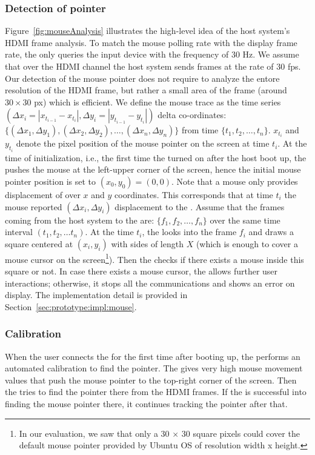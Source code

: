 \subsubsection{\bfseries Detection of pointer} Figure~\ref{fig:mouseAnalysis} illustrates the high-level idea of the host system's HDMI frame analysis. To match the mouse polling rate with the display frame rate, the \device only queries the input device with the frequency of $30$ Hz. We assume that over the HDMI channel the host system sends frames at the rate of $30$ fps. Our detection of the mouse pointer does not require to analyze the entore resolution of the HDMI frame, but rather a small area of the frame (around $30\times 30$ px) which is efficient. We define the mouse trace as the time series $(\Delta x_i = |x_{t_{i-1}} - x_{t_{i}}|, \Delta y_i=|y_{t_{i-1}} - y_{t_{i}}|)$ delta co-ordinates: $\{(\Delta x_1, \Delta y_1), (\Delta x_2, \Delta y_2), \ldots, (\Delta x_n, \Delta y_n)\}$ from time $\{t_1, t_2, \ldots, t_n\}$. $x_{t_{i}}$ and $y_{t_{i}}$ denote the pixel position of the mouse pointer on the screen at time $t_i$. At the time of initialization, i.e., the first time the \device turned on after the host boot up, the \device pushes the mouse at the left-upper corner of the screen, hence the initial mouse pointer position is set to $(x_0, y_0) = (0, 0)$.  
Note that a mouse only provides displacement of over $x$ and $y$ coordinates. This corresponds that at time $t_i$ the mouse reported $(\Delta x_i, \Delta y_i)$ displacement to the \device. Assume that the frames coming from the host system to the \device are: $\{f_1, f_2, \ldots, f_n\}$ over the same time interval $(t_1, t_2,\ldots t_n)$. At the time $t_i$, the \device looks into the frame $f_i$ and draws a square centered at $(x_i, y_i)$ with sides of length $X$ (which is enough to cover a mouse cursor on the screen\footnote{In our evaluation, we saw that only a 30 $\times$ 30 square pixels could cover the default mouse pointer provided by Ubuntu OS of resolution width x height.}). Then the \device checks if there exists a mouse inside this square or not. In case there exists a mouse cursor, the \device allows further user interactions; otherwise, it stops all the communications and shows an error on display. The implementation detail is provided in Section~\ref{sec:prototype:impl:mouse}.

\subsubsection{\bfseries Calibration}\label{sec:systemDesign:analysis:calibration} When the user connects the \device for the first time after booting up, the \device performs an automated calibration to find the pointer. The \device gives very high mouse movement values that push the mouse pointer to the top-right corner of the screen. Then the \device tries to find the pointer there from the HDMI frames. If the \device is successful into finding the mouse pointer there, it continues tracking the pointer after that.  

